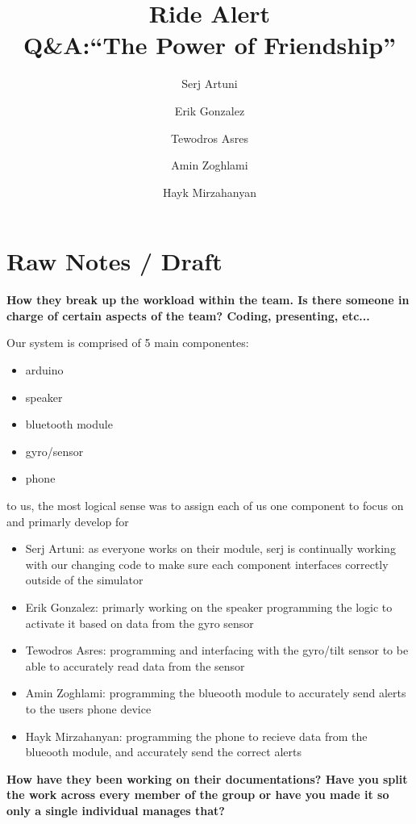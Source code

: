 \documentclass[12pt]{article}
\begin{document}
\title{\textbf{Ride Alert}\\[0.5em]\large{Q\&A:``The Power of Friendship''}}
\author{
Serj Artuni \and
Erik Gonzalez \and
Tewodros Asres \and
Amin Zoghlami \and
Hayk Mirzahanyan
}
\date{}
\maketitle

\section*{Raw Notes / Draft  }

\textbf{How they break up the workload within the team. Is there someone in charge of certain aspects of the team? Coding, presenting, etc...}

Our system is comprised of 5 main componentes:
\begin{itemize}
    \item arduino 
    \item speaker 
    \item bluetooth module
    \item gyro/sensor 
    \item phone 
\end{itemize}
to us, the most logical sense was to assign each of us one component to focus on and primarly develop for 
\begin{itemize}
    \item Serj Artuni: as everyone works on their module, serj is continually working with our changing code to make sure each component interfaces correctly outside of the simulator
    \item Erik Gonzalez: primarly working on the speaker programming the logic to activate it based on data from the gyro sensor
    \item Tewodros Asres: programming and interfacing with the gyro/tilt sensor to be able to accurately read data from the sensor 
    \item Amin Zoghlami: programming the blueooth module to accurately send alerts to the users phone device 
    \item Hayk Mirzahanyan: programming the phone to recieve data from the blueooth module, and accurately send the correct alerts 
\end{itemize}

\textbf{How have they been working on their documentations? Have you split the work across every member of the group or have you made it so only a single individual manages that?}
\end{document}
